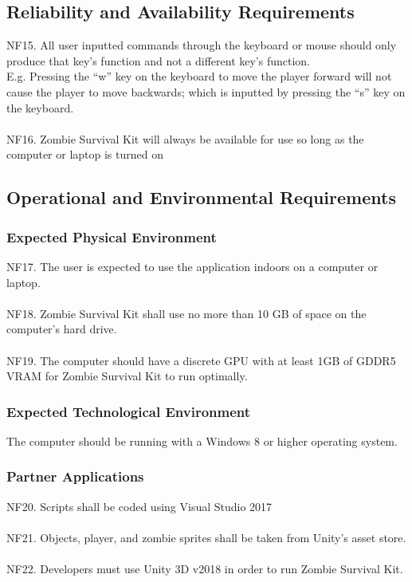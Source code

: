 \documentclass[12pt, titlepage]{article}
\begin{document}
\subsection{Reliability and Availability Requirements}
{\color{magenta} NF15.} All user inputted commands through the keyboard or mouse should only produce that key’s function and not a different key’s function.
\\
 E.g. Pressing the “w” key on the keyboard to move the player forward will not cause the player to move backwards; which is inputted by pressing the “s” key on the keyboard. 
\\\\
{\color{magenta} NF16.} Zombie Survival Kit will always be available for use so long as the computer or laptop is turned on


\subsection{Operational and Environmental Requirements}

\subsubsection{Expected Physical Environment}
{\color{magenta} NF17.} The user is expected to use the application indoors on a computer or laptop.
\\\\
{\color{magenta} NF18.} Zombie Survival Kit shall use no more than 10 GB of space on the computer’s hard drive.
\\\\
{\color{magenta} NF19.} The computer should have a discrete GPU with at least 1GB of GDDR5 VRAM for Zombie Survival Kit to run optimally.

\subsubsection{Expected Technological Environment}
The computer should be running with a Windows 8 or higher operating system.

\subsubsection{Partner Applications}
{\color{magenta} NF20.} Scripts shall be coded using Visual Studio 2017
\\\\
{\color{magenta} NF21.} Objects, player, and zombie sprites shall be taken from Unity’s asset store.
\\\\
{\color{magenta} NF22.} Developers must use Unity 3D v2018 in order to run Zombie Survival Kit.
\end{document}
